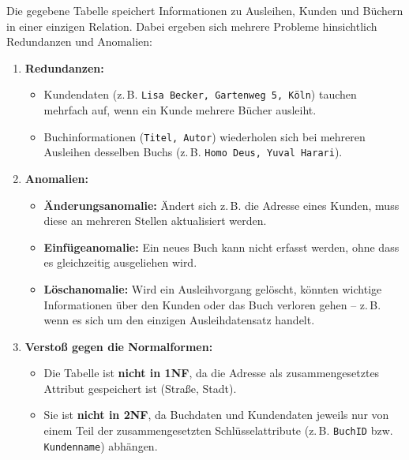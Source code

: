 \documentclass{article}
\begin{document}
	Die gegebene Tabelle speichert Informationen zu Ausleihen, Kunden und Büchern in einer einzigen Relation. Dabei ergeben sich mehrere Probleme hinsichtlich Redundanzen und Anomalien:
	
	\begin{enumerate}
		\item \textbf{Redundanzen:}
		\begin{itemize}
			\item Kundendaten (z.\,B. \texttt{Lisa Becker, Gartenweg 5, Köln}) tauchen mehrfach auf, wenn ein Kunde mehrere Bücher ausleiht.
			\item Buchinformationen (\texttt{Titel, Autor}) wiederholen sich bei mehreren Ausleihen desselben Buchs (z.\,B. \texttt{Homo Deus, Yuval Harari}).
		\end{itemize}
		
		\item \textbf{Anomalien:}
		\begin{itemize}
			\item \textbf{Änderungsanomalie:} Ändert sich z.\,B. die Adresse eines Kunden, muss diese an mehreren Stellen aktualisiert werden.
			\item \textbf{Einfügeanomalie:} Ein neues Buch kann nicht erfasst werden, ohne dass es gleichzeitig ausgeliehen wird.
			\item \textbf{Löschanomalie:} Wird ein Ausleihvorgang gelöscht, könnten wichtige Informationen über den Kunden oder das Buch verloren gehen – z.\,B. wenn es sich um den einzigen Ausleihdatensatz handelt.
		\end{itemize}
		
		\item \textbf{Verstoß gegen die Normalformen:}
		\begin{itemize}
			\item Die Tabelle ist \textbf{nicht in 1NF}, da die Adresse als zusammengesetztes Attribut gespeichert ist (Straße, Stadt).
			\item Sie ist \textbf{nicht in 2NF}, da Buchdaten und Kundendaten jeweils nur von einem Teil der zusammengesetzten Schlüsselattribute (z.\,B. \texttt{BuchID} bzw. \texttt{Kundenname}) abhängen.
			

\end{itemize}
\end{enumerate}
\end{document}
